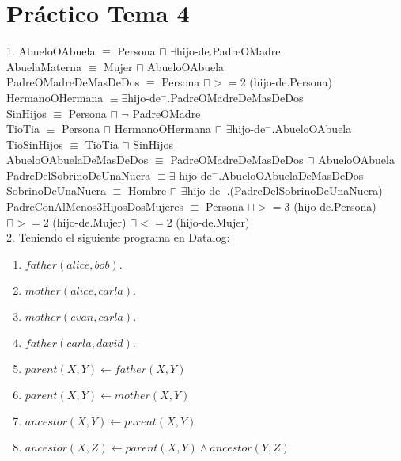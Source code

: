 \chapter{Práctico Tema 4}

1. AbueloOAbuela $\equiv$ Persona $\sqcap$ $\exists$hijo-de.PadreOMadre\\ 

AbuelaMaterna $\equiv$ Mujer $\sqcap$ AbueloOAbuela\\


PadreOMadreDeMasDeDos $\equiv$ Persona $\sqcap >= $2 (hijo-de.Persona)\\

HermanoOHermana $\equiv \exists$hijo-de$^-$.PadreOMadreDeMasDeDos\\

SinHijos $\equiv$ Persona $\sqcap$ $\neg$ PadreOMadre\\

TioTia $\equiv$ Persona $\sqcap$ HermanoOHermana $\sqcap$  $\exists$hijo-de$^-$.AbueloOAbuela\\

TioSinHijos $\equiv$ TioTia $\sqcap$ SinHijos\\


AbueloOAbuelaDeMasDeDos $\equiv$ PadreOMadreDeMasDeDos $\sqcap$ AbueloOAbuela\\

PadreDelSobrinoDeUnaNuera $\equiv \exists$ hijo-de$^-$.AbueloOAbuelaDeMasDeDos \\

SobrinoDeUnaNuera $\equiv$ Hombre $\sqcap$ $\exists$hijo-de$^-$.(PadreDelSobrinoDeUnaNuera)\\


PadreConAlMenos3HijosDosMujeres $\equiv$ Persona $\sqcap >=$3 (hijo-de.Persona) $\sqcap >=$2 (hijo-de.Mujer) $\sqcap <=$2 (hijo-de.Mujer)\\


2. Teniendo el siguiente programa en Datalog:

\begin{enumerate}
	\item $father(alice, bob).$
	\item $mother(alice, carla).$
	\item $mother(evan, carla).$
	\item $father(carla, david).$

	\item $parent(X, Y) \gets father(X, Y)$
	\item $parent(X, Y) \gets mother(X, Y)$
	\item $ancestor(X, Y) \gets parent(X, Y)$
	\item $ancestor(X,Z) \gets parent(X, Y) \land ancestor(Y, Z)$
\end{enumerate}

